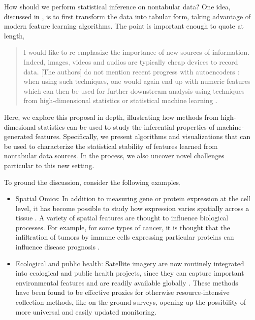 
How should we perform statistical inference on nontabular data? One idea,
discussed in \citep{buhlmann2019comments}, is to first transform the data into
tabular form, taking advantage of modern feature learning algorithms. The point
is important enough to quote at length,

\begin{quote}
I would like to re-emphasize the importance of new sources of information.
Indeed, images, videos and audios are typically cheap devices to record data.
[The authors] do not mention recent progress with autoencoders
\citep{hinton2006reducing, vincent2010stacked}: when using such techniques, one
would again end up with numeric features which can then be used for further
downstream analysis using techniques from high-dimensional statistics or
statistical machine learning \citep{hastie2015statistical,
  buhlmann2011statistics}.
\end{quote}

Here, we explore this proposal in depth, illustrating how methods from
high-dimesional statistics can be used to study the inferential properties of
machine-generated features. Specifically, we present algorithms and
visualizations that can be used to characterize the statistical stability of
features learned from nontabular data sources. In the process, we also uncover
novel challenges particular to this new setting.

To ground the discussion, consider the following examples,

\begin{itemize}
\item Spatial Omics: In addition to measuring gene or protein expression at the
  cell level, it has become possible to study how expression varies spatially
  across a tissue \citep{lundberg2019spatial}. A variety of spatial features are
  thought to influence biological processes. For example, for some types of
  cancer, it is thought that the infiltration of tumors by immune cells
  expressing particular proteins can influence disease prognosis
  \citep{keren2018structured}.
\item Ecological and public health: Satellite imagery are now routinely
  integrated into ecological and public health projects, since they can capture
  important environmental features and are readily available globally
  \citep{jean2016combining, bondimapping}. These methods have been found to be effective
  proxies for otherwise resource-intensive collection methods, like
  on-the-ground surveys, opening up the possibility of more universal and easily
  updated monitoring.
\end{itemize}

